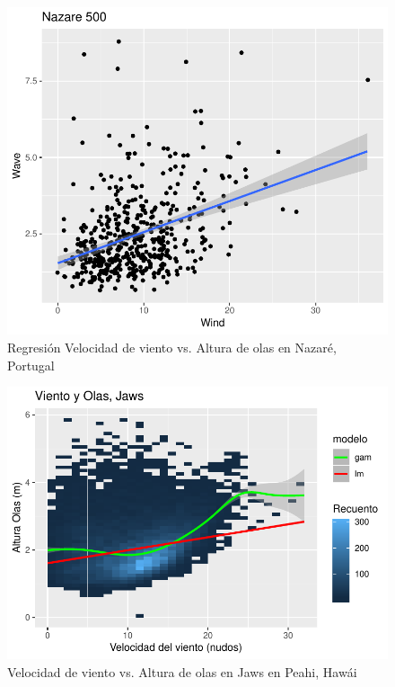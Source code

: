 \begin{figure}[H]
    \centering
    \includegraphics{./figures/nazare_500_lmFit.pdf}
    \caption{Regresión Velocidad de viento vs. Altura de olas en Nazaré, Portugal}
    \label{fig:wind_waves_nazare_fit}
\end{figure}


\begin{figure}[H]
    \centering
    \includegraphics{./figures/jaws_all.pdf}
    \caption{Velocidad de viento vs. Altura de olas en Jaws en Peahi, Hawái}
    \label{fig:wind_waves_jaws_all}
\end{figure}


